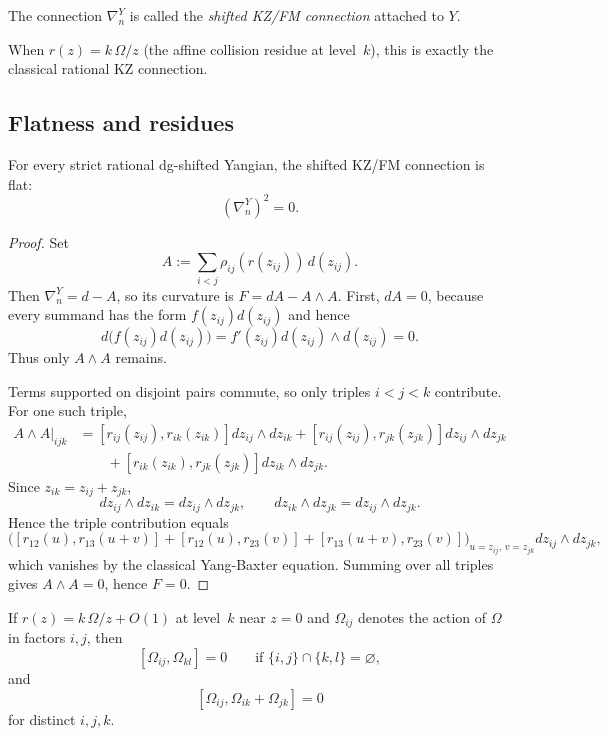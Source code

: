 \begin{definition}
The connection $\nabla_n^Y$ is called the \emph{shifted KZ/FM connection} attached to $Y$.
\end{definition}

When $r(z)=k\,\Omega/z$ (the affine collision residue at level~$k$), this is exactly the classical rational KZ connection.

\subsection{Flatness and residues}

\begin{theorem}\label{thm:strict-flatness}
For every strict rational dg-shifted Yangian, the shifted KZ/FM connection is flat:
\[
 (\nabla_n^Y)^2=0.
\]
\end{theorem}

\begin{proof}
Set
\[
 A:=\sum_{i<j}\rho_{ij}(r(z_{ij}))\,d(z_{ij}).
\]
Then $\nabla_n^Y=d-A$, so its curvature is $F=dA-A\wedge A$. First, $dA=0$, because every summand has the form $f(z_{ij})d(z_{ij})$ and hence
\[
 d\big(f(z_{ij})d(z_{ij})\big)=f'(z_{ij})d(z_{ij})\wedge d(z_{ij})=0.
\]
Thus only $A\wedge A$ remains.

Terms supported on disjoint pairs commute, so only triples $i<j<k$ contribute. For one such triple,
\begin{align*}
 A\wedge A\big|_{ijk}
 &= [r_{ij}(z_{ij}),r_{ik}(z_{ik})]dz_{ij}\wedge dz_{ik}
 + [r_{ij}(z_{ij}),r_{jk}(z_{jk})]dz_{ij}\wedge dz_{jk} \\
 &\qquad + [r_{ik}(z_{ik}),r_{jk}(z_{jk})]dz_{ik}\wedge dz_{jk}.
\end{align*}
Since $z_{ik}=z_{ij}+z_{jk}$,
\[
 dz_{ij}\wedge dz_{ik}=dz_{ij}\wedge dz_{jk},
 \qquad
 dz_{ik}\wedge dz_{jk}=dz_{ij}\wedge dz_{jk}.
\]
Hence the triple contribution equals
\[
 \Big([r_{12}(u),r_{13}(u+v)] + [r_{12}(u),r_{23}(v)] + [r_{13}(u+v),r_{23}(v)]\Big)_{u=z_{ij},\,v=z_{jk}}dz_{ij}\wedge dz_{jk},
\]
which vanishes by the classical Yang-Baxter equation. Summing over all triples gives $A\wedge A=0$, hence $F=0$.
\end{proof}

\begin{lemma}\label{lem:inf-braid}
If $r(z)=k\,\Omega/z+O(1)$ at level~$k$ near $z=0$ and $\Omega_{ij}$ denotes the action of $\Omega$ in factors $i,j$, then
\[
 [\Omega_{ij},\Omega_{kl}]=0 \qquad \text{if }\{i,j\}\cap\{k,l\}=\varnothing,
\]
and
\[
 [\Omega_{ij},\Omega_{ik}+\Omega_{jk}]=0
\]
for distinct $i,j,k$.
\end{lemma}

